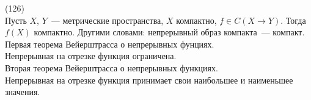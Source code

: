 (126)\\
Пусть $X$, $Y$~--- метрические пространства, $X$ компактно, $f \in C(X \to Y)$. Тогда $f(X)$ компактно. Другими словами: непрерывный образ компакта~--- компакт.\\
\q Первая теорема Вейерштрасса о непрерывных фунциях.\\
Непрерывная на отрезке функция ограничена.\\
\q Вторая теорема Вейерштрасса о непрерывных функциях.\\
Непрерывная на отрезке функция принимает свои наибольшее и наименьшее значения.
